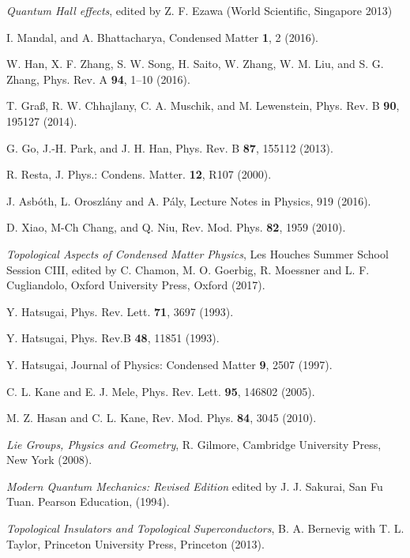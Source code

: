\documentclass[aps,pra,showpacs,twocolumn,superscriptaddress]{revtex4-1}
\begin{document}
\begin{thebibliography}{11}
 \textit{Quantum Hall effects}, edited by Z. F. Ezawa (World Scientific, Singapore 2013) 
  
 I. Mandal, and A. Bhattacharya, Condensed Matter \textbf{1}, 2 (2016).

 W. Han, X. F. Zhang, S. W. Song, H. Saito, W. Zhang, W. M. Liu, 
and S. G. Zhang, Phys. Rev. A \textbf{94}, 1–10 (2016).

 T. Graß, R. W. Chhajlany, C. A. Muschik, 
and M. Lewenstein, Phys. Rev. B \textbf{90}, 195127 (2014).

 G. Go, J.-H. Park, and J. H. Han, Phys. Rev. B \textbf{87}, 155112 (2013). 

 R. Resta, J. Phys.: Condens. Matter. {\bf 12}, R107 (2000). 

 J. Asb\'oth, L. Oroszl\'any and A. P\'aly, Lecture Notes in Physics, 919 (2016).

 D. Xiao, M-Ch Chang, and Q. Niu, Rev. Mod. Phys. {\bf 82}, 1959 (2010).

 \textit{Topological Aspects of Condensed Matter Physics}, Les Houches Summer School Session CIII, edited by C. Chamon, M. O. Goerbig, R. Moessner and L. F. Cugliandolo, Oxford University Press, Oxford (2017).

 Y. Hatsugai, Phys. Rev. Lett. \textbf{71}, 3697 (1993). 

 Y. Hatsugai, Phys. Rev.B \textbf{48}, 11851 (1993). 

 Y. Hatsugai, Journal of Physics: Condensed Matter \textbf{9}, 2507 (1997). 

 C. L. Kane and E. J. Mele, Phys. Rev. Lett. {\bf 95}, 146802 (2005). 

 M. Z. Hasan and C. L. Kane, Rev. Mod. Phys. {\bf 84}, 3045 (2010). 

 \textit{Lie Groups, Physics and Geometry}, R. Gilmore, Cambridge University Press, New York (2008).
  
\textit{Modern Quantum Mechanics: Revised Edition} edited by J. J. Sakurai, San Fu Tuan. 
Pearson Education, (1994).

 \textit{Topological Insulators and Topological Superconductors}, B. A. Bernevig with T. L. Taylor, Princeton University Press, Princeton (2013). 


\end{thebibliography}
\end{document}
